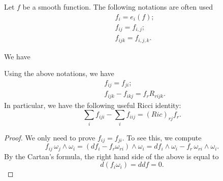  Let $f$ be a smooth function. The following notations are often used
 \begin{align*}
 & f_i=e_i(f);\\
 & f_{ij}=f_{i,j};\\
 &f_{ijk}=f_{i,j,k}.
 \end{align*}
 
 We have 
 
 \begin{corollary} Using the above notations, we have
 \begin{align*}
 & f_{ij}=f_{ji};\\
 & f_{ijk}-f_{ikj}=f_r R_{rijk}.
 \end{align*}
 In particular, we have the following useful Ricci identity:
 \[
 \sum_i f_{iji}-\sum_i f_{iij}=(Ric)_{rj}f_r.
 \]
 \end{corollary}
 
\begin{proof} We only need to prove $f_{ij}=f_{ji}$. To see this, we compute
 \[
 f_{ij}\,\omega_j\wedge\omega_i
 =(df_i-f_r\omega_{ri})\wedge \omega_i=df_i\wedge\omega_i-f_r\,\omega_{ri}\wedge\omega_i.
 \]
 By the Cartan's formula, the right hand side of the above is equal to
 \[
 d(f_i\omega_i)=ddf=0.
 \]
 
\end{proof}